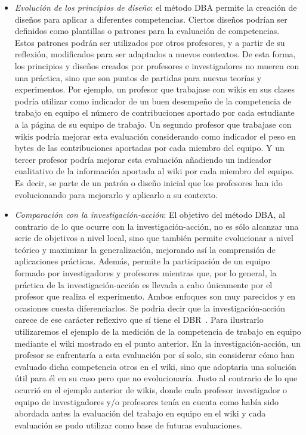 \begin{itemize}
\item \emph{Evolución de los principios de diseño}: el método DBA permite la creación de diseños para aplicar a diferentes competencias. Ciertos diseños podrían ser definidos como plantillas o patrones para la evaluación de competencias. Estos patrones podrán ser utilizados por otros profesores, y a partir de su reflexión, modificados para ser adaptados a nuevos contextos. De esta forma, los principios y diseños creados por profesores e investigadores no mueren con una práctica, sino que son puntos de partidas para nuevas teorías y experimentos. Por ejemplo, un profesor que trabajase con wikis en sus clases podría utilizar como indicador de un buen desempeño de la competencia de trabajo en equipo el número de contribuciones aportado por cada estudiante a la página de su equipo de trabajo. Un segundo profesor que trabajase con wikis podría mejorar esta evaluación considerando como indicador el peso en bytes de las contribuciones aportadas por cada miembro del equipo. Y un tercer profesor podría mejorar esta evaluación añadiendo un indicador cualitativo de la información aportada al wiki por cada miembro del equipo. Es decir, se parte de un patrón o diseño inicial que los profesores han ido evolucionando para mejorarlo y aplicarlo a su contexto.
\item \emph{Comparación con la investigación-acción}: El objetivo del método DBA, al contrario de lo que ocurre con la investigación-acción, no es sólo alcanzar una serie de objetivos a nivel local, sino que también permite evolucionar a nivel teórico y maximizar la generalización, mejorando así la comprensión de aplicaciones prácticas. Además, permite la participación de un equipo formado por investigadores y profesores mientras que, por lo general, la práctica de la investigación-acción es llevada a cabo únicamente por el profesor que realiza el experimento. Ambos enfoques son muy parecidos y en ocasiones cuesta diferenciarlos. Se podria decir que la investigación-acción carece de ese carácter reflexivo que sí tiene el DBR~\cite{cole2005being}. Para ilustrarlo utilizaremos el ejemplo de la medición de la competencia de trabajo en equipo mediante el wiki mostrado en el punto anterior. En la investigación-acción, un profesor se enfrentaría a esta evaluación por sí solo, sin considerar cómo han evaluado dicha competencia otros en el wiki, sino que adoptaria una solución útil para él en su caso pero que no evolucionaría. Justo al contrario de lo que ocurrió en el ejemplo anterior de wikis, donde cada profesor investigador o equipo de investigadores y/o profesores tenía en cuenta como había sido abordada antes la evaluación del trabajo en equipo en el wiki y cada evaluación se pudo utilizar como base de futuras evaluaciones.

\end{itemize}
